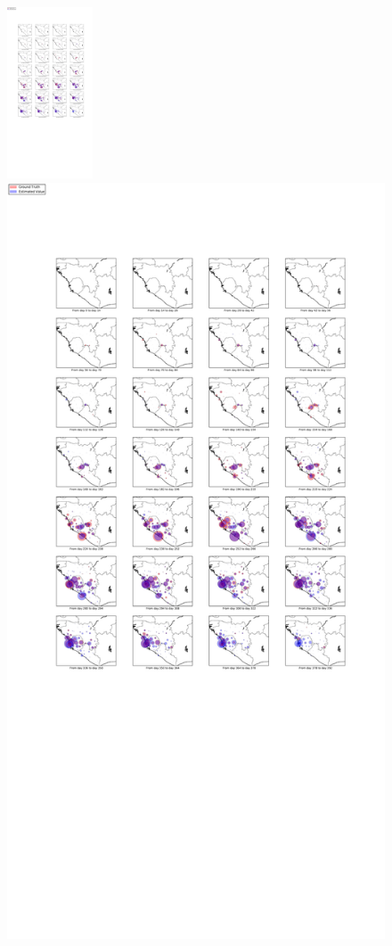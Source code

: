 \documentclass[11pt]{article}
\begin{document}
\begin{figure}[hbtp]
\begin{center}
  \includegraphics[width=1in]{graph/elabel.pdf}

  \includegraphics[width=5.9 in]{graph/ee.pdf}

\end{center}
\end{figure}
\end{document}
